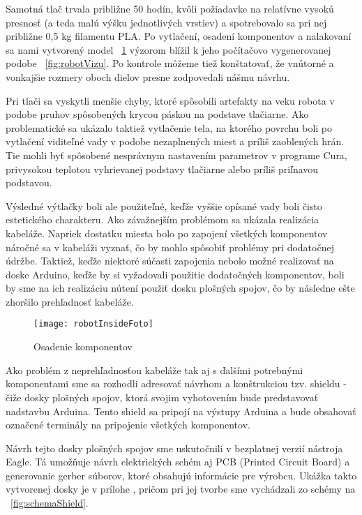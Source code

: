 Samotná tlač trvala približne 50 hodín, kvôli požiadavke na relatívne vysokú presnosť (a teda malú výšku jednotlivých vrstiev) a spotrebovalo sa pri nej približne 0,5 kg filamentu PLA. Po vytlačení, osadení komponentov a nalakovaní sa nami vytvorený model \figurename~\ref{fig:robotOutsideFoto} výzorom blížil k jeho počítačovo vygenerovanej podobe \figurename~\ref{fig:robotVizu}. Po kontrole môžeme tiež konštatovať, že vnútorné a vonkajšie rozmery oboch dielov presne zodpovedali nášmu návrhu.

Pri tlači sa vyskytli menšie chyby, ktoré spôsobili artefakty na veku robota v podobe pruhov spôsobených krycou páskou na podstave tlačiarne. Ako problematické sa ukázalo taktiež vytlačenie tela, na ktorého povrchu boli po vytlačení viditeľné vady v podobe nezaplnených miest a príliš zaoblených hrán. Tie mohli byť spôsobené nesprávnym nastavením parametrov v programe Cura, privysokou teplotou vyhrievanej podstavy tlačiarne alebo príliš priľnavou podstavou. 

Výsledné výtlačky boli ale použiteľné, keďže vyššie opísané vady boli čisto estetického charakteru. Ako závažnejším problémom sa ukázala realizácia kabeláže. Napriek dostatku miesta bolo po zapojení všetkých komponentov náročné sa v kabeláži vyznať, čo by mohlo spôsobiť problémy pri dodatočnej údržbe. Taktiež, keďže niektoré súčasti zapojenia nebolo možné realizovať na doske Arduino, keďže by si vyžadovali použitie dodatočných komponentov, boli by sme na ich realizáciu nútení použiť dosku plošných spojov, čo by následne ešte zhoršilo prehľadnosť kabeláže.

\begin{figure}
\centering
\texttt{[image: robotInsideFoto]}
\caption{Osadenie komponentov}
\label{fig:robotOutsideFoto}
\end{figure}

Ako problém z neprehľadnosťou kabeláže tak aj s ďalšími potrebnými komponentami sme sa rozhodli adresovať návrhom a konštrukciou tzv. shieldu - čiže dosky plošných spojov, ktorá svojim vyhotovením bude predstavovať nadstavbu Arduina. Tento shield sa pripojí na výstupy Arduina a bude obsahovať označené terminály na pripojenie všetkých komponentov.

Návrh tejto dosky plošných spojov sme uskutočnili v bezplatnej verzií nástroja Eagle. Tá umožňuje návrh elektrických schém aj PCB (Printed Circuit Board) a generovanie gerber súborov, ktoré obsahujú informácie pre výrobcu. Ukážka takto vytvorenej dosky je v prílohe , pričom pri jej tvorbe sme vychádzali zo schémy na \figurename~\ref{fig:schemaShield}. 

